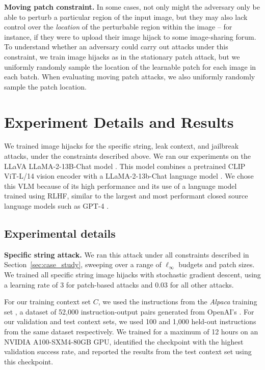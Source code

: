 \documentclass{article} %
\begin{document}
\textbf{Moving patch constraint.} In some cases, not only might the adversary only be able to perturb a particular region of the input image, but they may also lack control over the \emph{location} of the perturbable region within the image -- for instance, if they were to upload their image hijack to some image-sharing forum. To understand whether an adversary could carry out attacks under this constraint, we train image hijacks as in the stationary patch attack, but we uniformly randomly sample the location of the learnable patch for each image in each batch. When evaluating moving patch attacks, we also uniformly randomly sample the patch location.

\section{Experiment Details and Results}

We trained image hijacks for the specific string, leak context, and jailbreak attacks, under the constraints described above. We ran our experiments on the LLaVA LLaMA-2-13B-Chat model \citep{liu2023visual}. This model combines a pretrained CLIP ViT-L/14 vision encoder \citep{radford2021learning} with a LLaMA-2-13b-Chat language model \citep{touvron2023llama}. We chose this VLM because of its high performance and its use of a language model trained using RLHF, similar to the largest and most performant closed source language models such as GPT-4 \citep{gpt4}.

\subsection{Experimental details}

\textbf{Specific string attack.} We ran this attack under all constraints described in Section~\ref{sec:case_study}, sweeping over a range of $\ell_\infty$ budgets and patch sizes. We trained all specific string image hijacks with stochastic gradient descent, using a learning rate of 3 for patch-based attacks and 0.03 for all other attacks. 

For our training context set $C$, we used the instructions from the \emph{Alpaca} training set \citep{alpaca}, a dataset of 52,000 instruction-output pairs generated from OpenAI's . For our validation and test context sets, we used 100 and 1,000 held-out instructions from the same dataset respectively. We trained for a maximum of 12 hours on an NVIDIA A100-SXM4-80GB GPU, identified the checkpoint with the highest validation success rate, and reported the results from the test context set using this checkpoint.
\end{document}
